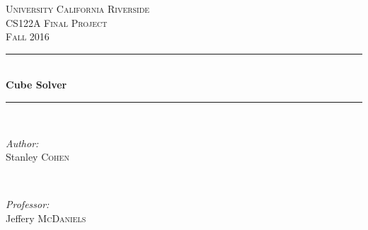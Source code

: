 \begin{titlepage}

\newcommand{\HRule}{\rule{\linewidth}{0.5mm}} %

\center %
 

\textsc{\LARGE University California Riverside}\\[1.5cm] %
\textsc{\Large CS122A Final Project}\\[0.5cm] %
\textsc{\large Fall 2016}\\[0.5cm] %


\HRule \\[0.4cm]
{ \huge \bfseries Cube Solver}\\[0.4cm] %
\HRule \\[1.5cm]
 

\begin{minipage}{0.4\textwidth}
\begin{flushleft} \large
\emph{Author:}\\
Stanley \textsc{Cohen} %
\end{flushleft}
\end{minipage}
~
\begin{minipage}{0.4\textwidth}
\begin{flushright} \large
\emph{Professor:} \\
Jeffery \textsc{McDaniels} %
\end{flushright}
\end{minipage}\\[2cm]



\end{titlepage}
